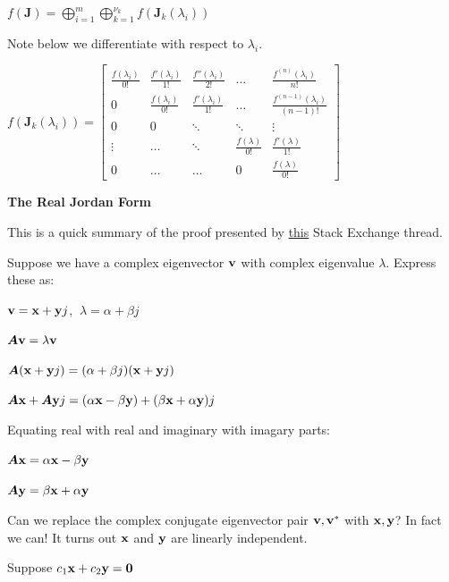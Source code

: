 \documentclass[11pt]{article}
\begin{document}
  \(f(\bm{J}) = \displaystyle \bigoplus_{i = 1}^{m} \bigoplus_{k = 1}^{\nu_k}f(\bm{J}_k(\lambda_i))\)

  Note below we differentiate with respect to \(\lambda_i\).

  \(f(\bm{J}_k(\lambda_i)) =
  \begin{bmatrix}
    \frac{f(\lambda_i)}{0!} & \frac{f'(\lambda_i)}{1!} & \frac{f''(\lambda_i)}{2!} & \dots & \frac{f^{(n)}(\lambda_i)}{n!} \\
    0 & \frac{f(\lambda_i)}{0!} & \frac{f'(\lambda_i)}{1!} & \dots & \frac{f^{(n - 1)}(\lambda_i)}{(n - 1)!} \\
    0 & 0 & \ddots & \ddots & \vdots \\
    \vdots & \dots & \ddots & \frac{f(\lambda)}{0!} & \frac{f'(\lambda)}{1!} \\
    0 & \dots & \dots & 0 & \frac{f(\lambda)}{0!}
  \end{bmatrix}\)

  \textbf{The Real Jordan Form}
  \label{Real-Jordan-Form}

  This is a quick summary of the proof presented by
  \href{https://math.stackexchange.com/questions/769312/proof-for-real-jordan-canonical-form}{this} Stack Exchange thread.

  Suppose we have a complex eigenvector \(\mathbf{v}\) with complex eigenvalue \(\lambda\). Express these as:

  \(\mathbf{v} = \mathbf{x} + \mathbf{y}j\),
  \(\ \lambda = \alpha + \beta j\)

  \(\bm{A}\mathbf{v} = \lambda\mathbf{v}\)

  \(\bm{A}{\left( \mathbf{x} + \mathbf{y}j \right)} = (\alpha + \beta j){\left( \mathbf{x} + \mathbf{y}j \right)}\)

  \(\bm{A}\mathbf{x} + \bm{A}\mathbf{y}j = (\alpha\mathbf{x} - \beta\mathbf{y}) + (\beta\mathbf{x} + \alpha\mathbf{y})j\)

  Equating real with real and imaginary with imagary parts:

  \(\bm{A}\mathbf{x} = \alpha\mathbf{x} - \beta\mathbf{y}\)

  \(\bm{A}\mathbf{y} = \beta\mathbf{x} + \alpha\mathbf{y}\)

  Can we replace the complex conjugate eigenvector pair \(\mathbf{v}, \mathbf{v}^*\) with \(\mathbf{x}, \mathbf{y}\)?
  In fact we can! It turns out \(\mathbf{x}\) and \(\mathbf{y}\) are linearly independent.

  \pagebreak

  Suppose \(c_1\mathbf{x} + c_2\mathbf{y} = \mathbf{0}\)
\end{document}
